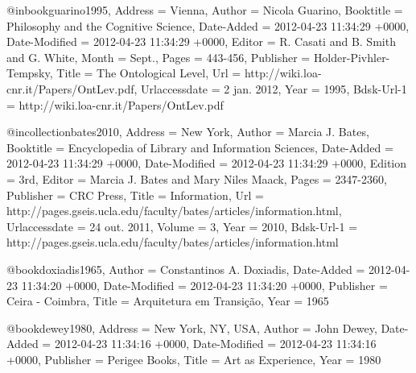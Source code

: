 @inbook{guarino1995,
	Address = {Vienna},
	Author = {Nicola Guarino},
	Booktitle = {Philosophy and the Cognitive Science},
	Date-Added = {2012-04-23 11:34:29 +0000},
	Date-Modified = {2012-04-23 11:34:29 +0000},
	Editor = {R. Casati and B. Smith and G. White},
	Month = {Sept.},
	Pages = {443-456},
	Publisher = {Holder-Pivhler-Tempsky},
	Title = {The Ontological Level},
	Url = {http://wiki.loa-cnr.it/Papers/OntLev.pdf},
	Urlaccessdate = {2 jan. 2012},
	Year = {1995},
	Bdsk-Url-1 = {http://wiki.loa-cnr.it/Papers/OntLev.pdf}}

@incollection{bates2010,
	Address = {New York},
	Author = {Marcia J. Bates},
	Booktitle = {Encyclopedia of Library and Information Sciences},
	Date-Added = {2012-04-23 11:34:29 +0000},
	Date-Modified = {2012-04-23 11:34:29 +0000},
	Edition = {3rd},
	Editor = {Marcia J. Bates and Mary Niles Maack},
	Pages = {2347-2360},
	Publisher = {CRC Press},
	Title = {Information},
	Url = {http://pages.gseis.ucla.edu/faculty/bates/articles/information.html},
	Urlaccessdate = {24 out. 2011},
	Volume = {3},
	Year = {2010},
	Bdsk-Url-1 = {http://pages.gseis.ucla.edu/faculty/bates/articles/information.html}}

@book{doxiadis1965,
	Author = {Constantinos A. Doxiadis},
	Date-Added = {2012-04-23 11:34:20 +0000},
	Date-Modified = {2012-04-23 11:34:20 +0000},
	Publisher = {Ceira - Coimbra},
	Title = {Arquitetura em Transi{\c c}{\~a}o},
	Year = {1965}}

@book{dewey1980,
	Address = {New York, NY, USA},
	Author = {John Dewey},
	Date-Added = {2012-04-23 11:34:16 +0000},
	Date-Modified = {2012-04-23 11:34:16 +0000},
	Publisher = {Perigee Books},
	Title = {Art as Experience},
	Year = {1980}}

